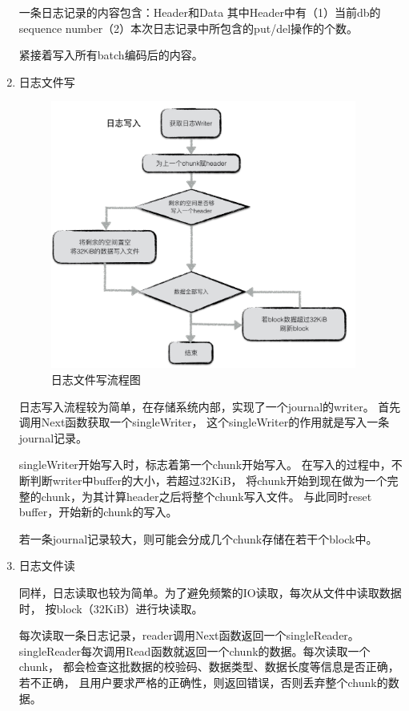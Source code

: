 \begin{enumerate}
		一条日志记录的内容包含：Header和Data
		其中Header中有（1）当前db的sequence number（2）本次日志记录中所包含的put/del操作的个数。
		
		紧接着写入所有batch编码后的内容。
		\item 日志文件写 
		
		\begin{figure}[H]
			\centering
			\includegraphics[width=0.95\textwidth]{images/journal_write}
			\caption{日志文件写流程图}
			\label{journal_write}
		\end{figure}
		
		日志写入流程较为简单，在存储系统内部，实现了一个journal的writer。
		首先调用Next函数获取一个singleWriter，
		这个singleWriter的作用就是写入一条journal记录。

		singleWriter开始写入时，标志着第一个chunk开始写入。
		在写入的过程中，不断判断writer中buffer的大小，若超过32KiB，
		将chunk开始到现在做为一个完整的chunk，为其计算header之后将整个chunk写入文件。
		与此同时reset buffer，开始新的chunk的写入。

		若一条journal记录较大，则可能会分成几个chunk存储在若干个block中。

		\item 日志文件读 
		
		同样，日志读取也较为简单。为了避免频繁的IO读取，每次从文件中读取数据时，
		按block（32KiB）进行块读取。

		每次读取一条日志记录，reader调用Next函数返回一个singleReader。
		singleReader每次调用Read函数就返回一个chunk的数据。每次读取一个chunk，
		都会检查这批数据的校验码、数据类型、数据长度等信息是否正确，若不正确，
		且用户要求严格的正确性，则返回错误，否则丢弃整个chunk的数据。


\end{enumerate}
